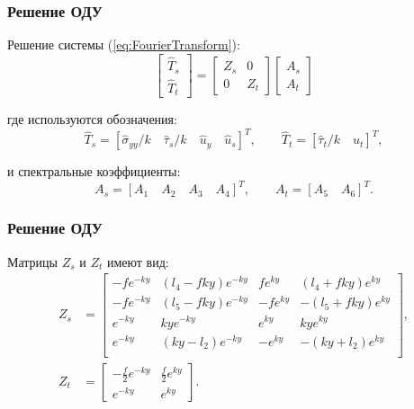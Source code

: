 \documentclass[10pt]{beamer}
\begin{document}
\begin{frame}
\frametitle{Решение ОДУ}
Решение системы (\ref{eq:FourierTransform}):
\begin{equation}
	\label{eq:FourierSolution}
	\left[
	\begin{array}{c}
		\hat{T}_s \\
		\hat{T}_t 
	\end{array}
	\right]
	=
	\left[
	\begin{array}{cc}
		Z_s & 0 \\
		0 & Z_t 
	\end{array}
	\right]
	\left[
	\begin{array}{c}
		A_s \\
		A_t 
	\end{array}
	\right]
\end{equation}

где используются обозначения:
\begin{equation}
	\label{eq:FourierSeparateT}
	\hat{T}_s = \left[\hat{\sigma}_{yy}/k \quad \hat{\tau}_s/k \quad \hat{u}_y \quad \hat{u}_s \right]^T, \qquad 
	\hat{T}_t = \left[ \hat{\tau}_t/k \quad  \hat{u}_t \right]^T,
\end{equation}

и спектральные коэффициенты:
\begin{equation}
	\label{eq:FourierSeparateA}
	A_s = \left[ A_1 \quad A_2 \quad A_3 \quad A_4 \right]^T, \qquad 
	A_t= \left[ A_5 \quad A_6 \right]^T.
\end{equation}
\end{frame}



\begin{frame}
\frametitle{Решение ОДУ}
Матрицы $Z_s$ и $Z_t$ имеют вид:
\begin{equation}
	\label{eq:FourierSeparateA}
	\begin{split}
	Z_s & = 
	\left[
	\begin{array}{cccc}
		-fe^{-ky} & (l_4-fky)e^{-ky} & fe^{ky} & (l_4+fky)e^{ky} \\
		-fe^{-ky} & (l_5-fky)e^{-ky} & -fe^{ky} & -(l_5+fky)e^{ky} \\
		e^{-ky} & kye^{-ky} & e^{ky} & kye^{ky} \\
		e^{-ky} & (ky-l_2)e^{-ky} & -e^{ky} & -(ky+l_2)e^{ky} \\
	\end{array}
	\right],
	\\
	Z_t & = 
	\left[
	\begin{array}{cc}
		-\frac{f}{2}e^{-ky} & \frac{f}{2}e^{ky} \\
		e^{-ky} & e^{ky}
	\end{array}
	\right].
	\end{split}
\end{equation}
\end{frame}
\end{document}
